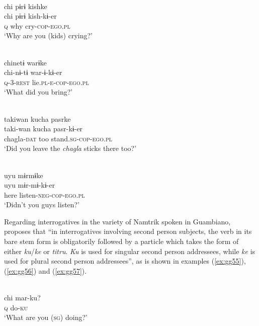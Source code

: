 \documentclass[output=paper]{langsci/langscibook}
\begin{document}


\ea \label{ex:gg51}
\\
	\glll chi pɨrɨ kishke\\
	chi	pɨrɨ kish-kɨ-er\\
	\textsc{q} why cry-\textsc{cop-ego.pl}\\
	\glt `Why are you (kids) crying?'
\z

\ea \label{ex:gg52}
\\
	\glll chinetɨ warɨke\\
	chi-nɨ-tɨ war-ɨ-kɨ-er\\
	\textsc{q}-3-\textsc{rest}	lie.\textsc{pl-e-cop-ego.pl}\\
	\glt `What did you bring?'
\z


\ea \label{ex:gg53}
\\
	\glll takiwan kucha pasrke\\
	taki-wan	kucha	pasr-kɨ-er\\
	chagla-\textsc{dat }	too	stand.\textsc{sg-cop-ego.pl}\\
	\glt `Did you leave the \textit{chagla} sticks there too?'
\z


\ea \label{ex:gg54}
\\
	\glll uyu mɨrmɨke\\
	uyu mɨr-mɨ-kɨ-er\\
	here listen-\textsc{neg-cop-ego.pl}\\
	\glt `Didn’t you guys listen?’
\z



Regarding interrogatives in the variety of Namtrik spoken in Guambiano, \citet{Norcliffe2018} proposes that “in interrogatives involving second person subjects, the verb in its bare stem form is obligatorily followed by a particle which takes the form of either \textit{ku}/\textit{ke} or \textit{titru}. \textit{Ku} is used for singular second person addressees, while \textit{ke} is used for plural second person addressees'', as is shown in examples (\ref{ex:gg55}), (\ref{ex:gg56}) and (\ref{ex:gg57}). 

\ea \label{ex:gg55}
\\
	\gll chi	mar-ku?\\
	\textsc{q} do-\textsc{ku}\\
	\glt ‘What are you (\textsc{sg}) doing?’
\z
\end{document}
